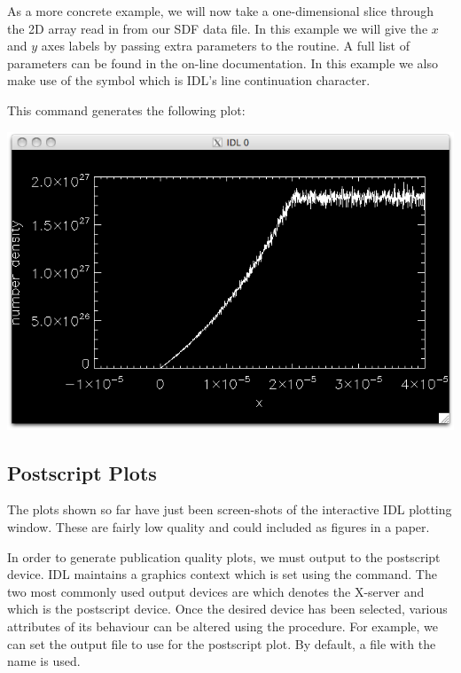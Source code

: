   As a more concrete example, we will now take a one-dimensional slice through
  the 2D\linebreak {} array read in from our SDF data file.
  In this example we will give the $x$ and $y$ axes labels by passing extra
  parameters to the  routine. A full list of parameters can be found
  in the on-line documentation. In this example we also make use of the
  \qtt{\$} symbol which is IDL's line continuation character.

  This command generates the following plot:
  \begin{center}
    \includegraphics[width=0.7\linewidth]{images/idl_plot}
  \end{center}

\subsection{Postscript Plots}
  The plots shown so far have just been screen-shots of the interactive
  IDL plotting window. These are fairly low quality and could included as
  figures in a paper.

  In order to generate publication quality plots, we must output to the
  postscript device. IDL maintains a graphics context which is set using
  the  command. The two most commonly used output devices
  are  which denotes the X-server and  which is the postscript
  device. Once the desired device has been selected, various attributes
  of its behaviour can be altered using the  procedure.
  For example, we can set the output file to use for the postscript plot.
  By default, a file with the name  is used.


